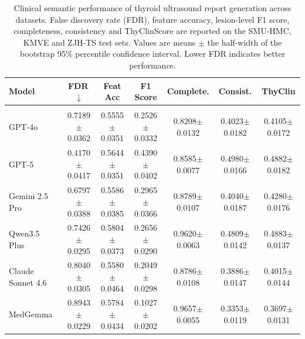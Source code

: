 \begin{table}[p]
\centering
\begin{threeparttable}

\caption{Clinical semantic performance of thyroid ultrasound report generation across datasets. False discovery rate (FDR), feature accuracy, lesion-level F1 score, completeness, consistency and ThyClinScore are reported on the SMU-HMC, KMVE and ZJH-TS test sets. Values are means $\pm$ the half-width of the bootstrap 95\% percentile confidence interval. Lower FDR indicates better performance.}
\label{tab:report_generation_clinical_ci}

\footnotesize
\setlength{\tabcolsep}{5.2pt}
\renewcommand{\arraystretch}{1.04}

\begin{tabular}{lcccccc}
\toprule
\textbf{Model}
& \textbf{FDR}\,$\downarrow$
& \textbf{Feat Acc}
& \textbf{F1 Score}
& \textbf{Complete.}
& \textbf{Consist.}
& \textbf{ThyClin} \\
\midrule

\rowcolor{gray!20}
\multicolumn{7}{c}{\textbf{SMU-HMC Testset} ($n=400$)} \\

GPT-4o~\cite{openai_gpt4_2024}
& 0.7189$\pm$0.0362
& 0.5555$\pm$0.0351
& 0.2526$\pm$0.0332
& 0.8208$\pm$0.0132
& 0.4023$\pm$0.0182
& 0.4105$\pm$0.0172 \\

GPT-5~\cite{openai2025gpt5systemcard}
& 0.4170$\pm$0.0417
& 0.5644$\pm$0.0351
& 0.4390$\pm$0.0402
& 0.8585$\pm$0.0077
& 0.4980$\pm$0.0166
& 0.4882$\pm$0.0182 \\

Gemini 2.5 Pro~\cite{comanici_gemini_2025}
& 0.6797$\pm$0.0388
& 0.5586$\pm$0.0385
& 0.2965$\pm$0.0366
& 0.8789$\pm$0.0107
& 0.4040$\pm$0.0187
& 0.4280$\pm$0.0176 \\

Qwen3.5 Plus~\cite{yang_qwen3_2025}
& 0.7426$\pm$0.0295
& 0.5804$\pm$0.0373
& 0.2656$\pm$0.0290
& 0.9620$\pm$0.0063
& 0.4809$\pm$0.0142
& 0.4883$\pm$0.0137 \\

Claude Sonnet 4.6
& 0.8040$\pm$0.0305
& 0.5580$\pm$0.0464
& 0.2049$\pm$0.0298
& 0.8786$\pm$0.0108
& 0.3886$\pm$0.0147
& 0.4015$\pm$0.0144 \\

MedGemma~\cite{sellergren2025medgemma}
& 0.8943$\pm$0.0229
& 0.5784$\pm$0.0434
& 0.1027$\pm$0.0202
& 0.9657$\pm$0.0055
& 0.3353$\pm$0.0119
& 0.3697$\pm$0.0131 \\


\end{tabular}
\end{threeparttable}
\end{table}
